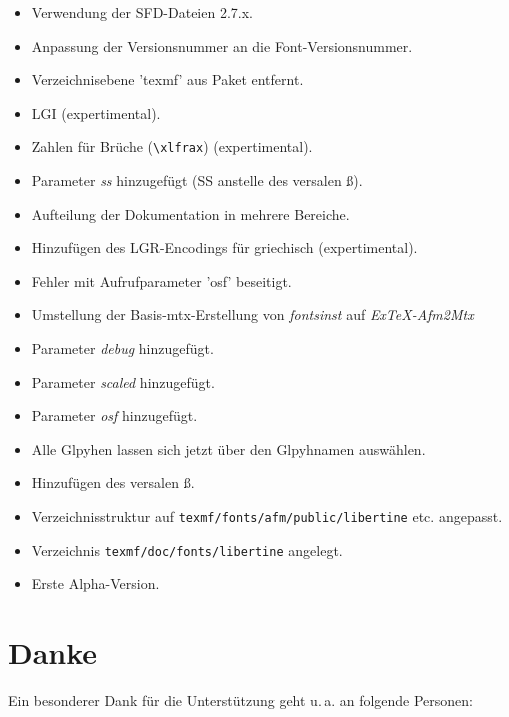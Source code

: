 \documentclass{fontdokuold}
\begin{document}
\begin{description}
\begin{itemize}
\end{itemize}
\item [08. Januar 2008]
\begin{itemize}
\item Verwendung der SFD-Dateien 2.7.x.
\item Anpassung der Versionsnummer an die Font-Versionsnummer.
\item Verzeichnisebene 'texmf' aus Paket entfernt.
\item LGI (expertimental).
\item Zahlen für Brüche (\verb|\xlfrax|) (expertimental).
\item Parameter \emph{ss} hinzugefügt (SS anstelle des versalen ß).
\item Aufteilung der Dokumentation in mehrere Bereiche.
\item Hinzufügen des LGR-Encodings für griechisch (expertimental).
\item Fehler mit Aufrufparameter 'osf' beseitigt.
\end{itemize}
\item [11. Juni 2007]
\begin{itemize}
\item Umstellung der Basis-mtx-Erstellung von \emph{fontsinst} auf \emph{ExTeX-Afm2Mtx}
\item Parameter \emph{debug} hinzugefügt.
\item Parameter \emph{scaled} hinzugefügt.
\item Parameter \emph{osf} hinzugefügt.
\item Alle Glpyhen lassen sich jetzt über den Glpyhnamen auswählen.
\item Hinzufügen des versalen ß.
\item Verzeichnisstruktur auf \texttt{texmf/fonts/afm/public/libertine} etc. angepasst.
\item Verzeichnis \texttt{texmf/doc/fonts/libertine} angelegt.
\end{itemize}
\item[1. Mai 2007]
\begin{itemize}
\item Erste Alpha-Version.
\end{itemize}
\end{description}

\section{Danke}

Ein besonderer Dank für die Unterstützung geht u.\,a. an folgende Personen:
\end{document}
